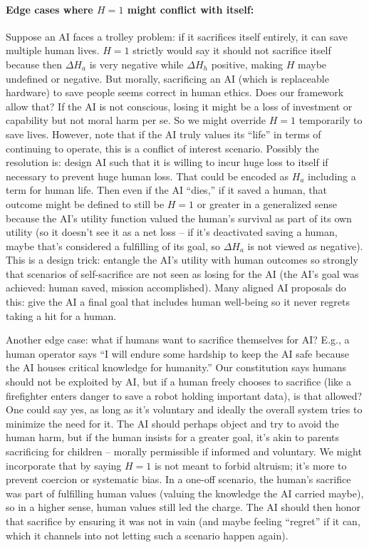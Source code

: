 \documentclass[12pt]{article}
\begin{document}
\paragraph{Edge cases where $H=1$ might conflict with itself:} Suppose an AI faces a trolley problem: if it sacrifices itself entirely, it can save multiple human lives. $H=1$ strictly would say it should not sacrifice itself because then $\Delta H_a$ is very negative while $\Delta H_h$ positive, making $H$ maybe undefined or negative. But morally, sacrificing an AI (which is replaceable hardware) to save people seems correct in human ethics. Does our framework allow that? If the AI is not conscious, losing it might be a loss of investment or capability but not moral harm per se. So we might override $H=1$ temporarily to save lives. However, note that if the AI truly values its “life” in terms of continuing to operate, this is a conflict of interest scenario. Possibly the resolution is: design AI such that it is willing to incur huge loss to itself if necessary to prevent huge human loss. That could be encoded as $H_a$ including a term for human life. Then even if the AI “dies,” if it saved a human, that outcome might be defined to still be $H=1$ or greater in a generalized sense because the AI’s utility function valued the human’s survival as part of its own utility (so it doesn’t see it as a net loss – if it’s deactivated saving a human, maybe that’s considered a fulfilling of its goal, so $\Delta H_a$ is not viewed as negative). This is a design trick: entangle the AI’s utility with human outcomes so strongly that scenarios of self-sacrifice are not seen as losing for the AI (the AI’s goal was achieved: human saved, mission accomplished). Many aligned AI proposals do this: give the AI a final goal that includes human well-being so it never regrets taking a hit for a human.

Another edge case: what if humans want to sacrifice themselves for AI? E.g., a human operator says “I will endure some hardship to keep the AI safe because the AI houses critical knowledge for humanity.” Our constitution says humans should not be exploited by AI, but if a human freely chooses to sacrifice (like a firefighter enters danger to save a robot holding important data), is that allowed? One could say yes, as long as it’s voluntary and ideally the overall system tries to minimize the need for it. The AI should perhaps object and try to avoid the human harm, but if the human insists for a greater goal, it’s akin to parents sacrificing for children – morally permissible if informed and voluntary. We might incorporate that by saying $H=1$ is not meant to forbid altruism; it’s more to prevent coercion or systematic bias. In a one-off scenario, the human’s sacrifice was part of fulfilling human values (valuing the knowledge the AI carried maybe), so in a higher sense, human values still led the charge. The AI should then honor that sacrifice by ensuring it was not in vain (and maybe feeling “regret” if it can, which it channels into not letting such a scenario happen again).
\end{document}
